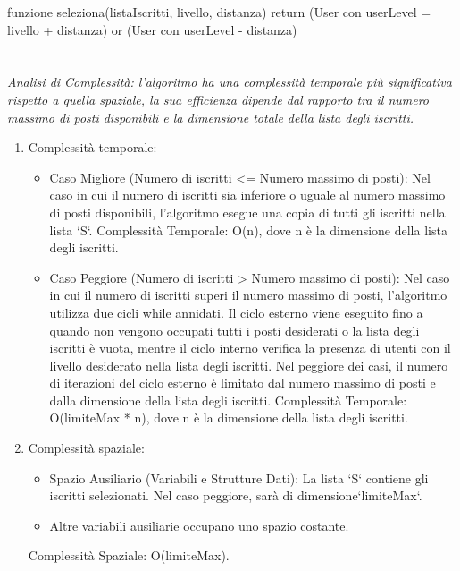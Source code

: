 funzione seleziona(listaIscritti, livello, distanza)
    return (User con userLevel = livello + distanza) or (User con userLevel - distanza)
\\
\\
\\
\textit{Analisi di Complessità: l'algoritmo ha una complessità temporale più significativa rispetto a quella spaziale, la sua efficienza dipende dal rapporto tra il numero massimo di posti disponibili e la dimensione totale della lista degli iscritti.}
\begin{enumerate}
	\item Complessità temporale: 
        \begin{itemize}
            \item Caso Migliore (Numero di iscritti <= Numero massimo di posti):
                Nel caso in cui il numero di iscritti sia inferiore o uguale al numero massimo di posti disponibili, l'algoritmo esegue una copia di tutti gli iscritti nella lista `S`.
                Complessità Temporale: O(n), dove n è la dimensione della lista degli iscritti.
            \item Caso Peggiore (Numero di iscritti > Numero massimo di posti):
                Nel caso in cui il numero di iscritti superi il numero massimo di posti, l'algoritmo utilizza due cicli while annidati. Il ciclo esterno viene eseguito fino a quando non vengono occupati tutti i posti desiderati o la lista degli iscritti è vuota, mentre il ciclo interno verifica la presenza di utenti con il livello desiderato nella lista degli iscritti.
                Nel peggiore dei casi, il numero di iterazioni del ciclo esterno è limitato dal numero massimo di posti e dalla dimensione della lista degli iscritti.
                Complessità Temporale: O(limiteMax * n), dove n è la dimensione della lista degli
                iscritti.
        \end{itemize}
	\item Complessità spaziale: 
        \begin{itemize}
            \item Spazio Ausiliario (Variabili e Strutture Dati): La lista `S` contiene gli             iscritti selezionati. Nel caso peggiore, sarà di dimensione`limiteMax`.
            \item Altre variabili ausiliarie occupano uno spazio costante.
        \end{itemize}    
            Complessità Spaziale: O(limiteMax).
\end{enumerate}
\\
